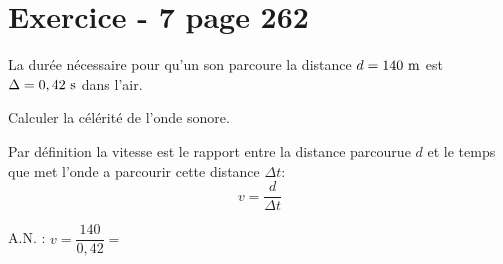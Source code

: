 \documentclass[12pt,a4paper]{exam}
\begin{document}
\section*{Exercice - 7 page 262}

La durée nécessaire pour qu'un son parcoure la distance $d=140~\rm m$ est $\Delta = 0,42~\rm s$ dans l'air.

\begin{questions}
    \question Calculer la célérité de l'onde sonore.

    \begin{solution}
        Par définition la vitesse est le rapport entre la distance parcourue $d$ et le temps que met l'onde a parcourir cette distance $\Delta t$:
        \[v=\dfrac{d}{\Delta t}\]

        A.N. : $v = \dfrac{140}{0,42} = $
    \end{solution}
\end{questions}
\end{document}
